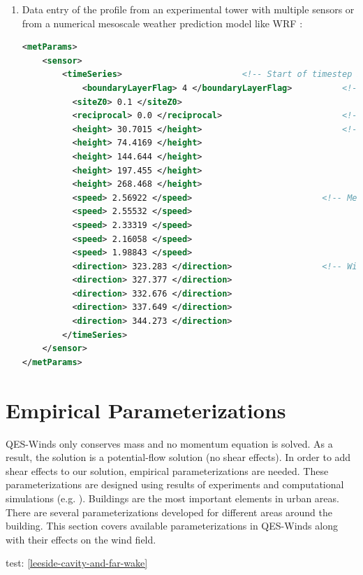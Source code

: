 \begin{enumerate}
\item Data entry of the profile from an experimental tower with multiple sensors or from a numerical mesoscale weather prediction model like WRF \cite{powers2017weather}:

\begin{lstlisting}[language=XML]
<metParams>
	<sensor>
	    <timeSeries>						<!-- Start of timestep informastion for a sensor -->
       		<boundaryLayerFlag> 4 </boundaryLayerFlag> 			<!-- Site boundary layer flag (1-log, 2-exp, 3-urban canopy, 4-data entry) -->
          <siteZ0> 0.1 </siteZ0> 									<!-- Site z0 -->
          <reciprocal> 0.0 </reciprocal> 						<!-- Reciprocal Monin-Obukhov Length (1/m) -->
          <height> 30.7015 </height> 							<!-- Height of the sensor -->
          <height> 74.4169 </height>
          <height> 144.644 </height>
          <height> 197.455 </height>
          <height> 268.468 </height>
          <speed> 2.56922 </speed> 							<!-- Measured speed at the sensor height -->
          <speed> 2.55532 </speed>
          <speed> 2.33319 </speed>
          <speed> 2.16058 </speed>
          <speed> 1.98843 </speed>
          <direction> 323.283 </direction> 					<!-- Wind direction of sensor -->
          <direction> 327.377 </direction>
          <direction> 332.676 </direction>
          <direction> 337.649 </direction>
          <direction> 344.273 </direction>
    	</timeSeries>
	</sensor>
</metParams>
\end{lstlisting}

\end{enumerate}

\section{Empirical Parameterizations}

QES-Winds only conserves mass and no momentum equation is solved. As a result, the solution is a potential-flow solution (no shear effects). In order to add shear effects to our solution, empirical parameterizations are needed. These parameterizations are designed using results of experiments and computational simulations (e.g. \cite{singh2008evaluation,brown2013quic}). Buildings are the most important elements in urban areas. There are several parameterizations developed for different areas around the building. This section covers available parameterizations in QES-Winds along with their effects on the wind field.

test:  \ref{leeside-cavity-and-far-wake}

